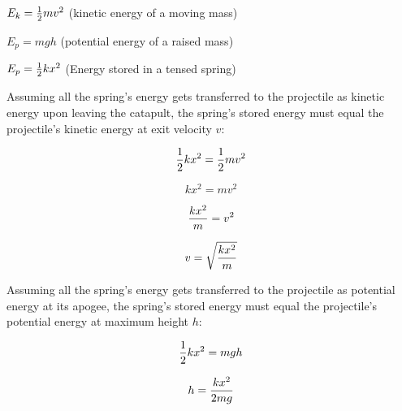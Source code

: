 $E_k = {1 \over 2}mv^2$  (kinetic energy of a moving mass)

\vskip 10pt

$E_p = mgh$  (potential energy of a raised mass)

\vskip 10pt

$E_p = {1 \over 2} kx^2$  (Energy stored in a tensed spring)

\vskip 10pt

Assuming all the spring's energy gets transferred to the projectile as kinetic energy upon leaving the catapult, the spring's stored energy must equal the projectile's kinetic energy at exit velocity $v$:

$${1 \over 2} kx^2 = {1 \over 2}mv^2$$

$$kx^2 = mv^2$$

$${kx^2 \over m} = v^2$$

$$v = \sqrt{kx^2 \over m}$$

\vskip 10pt

Assuming all the spring's energy gets transferred to the projectile as potential energy at its apogee, the spring's stored energy must equal the projectile's potential energy at maximum height $h$:

$${1 \over 2} kx^2 = mgh$$

$$h = {kx^2 \over 2mg}$$




